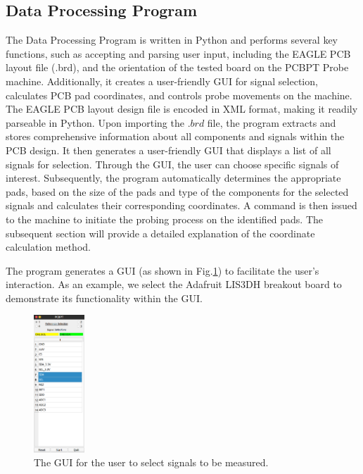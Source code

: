\documentclass[sigconf]{acmart}
\begin{document}
\subsection{Data Processing Program}
The Data Processing Program is written in Python and performs several key functions, such as accepting and parsing user input, including the EAGLE PCB layout file (.brd), and the orientation of the tested board on the PCBPT Probe machine. Additionally, it creates a user-friendly GUI for signal selection, calculates PCB pad coordinates, and controls probe movements on the machine.
The EAGLE PCB layout design file is encoded in XML format, making it readily parseable in Python. Upon importing the $.brd$ file, the program extracts and stores comprehensive information about all components and signals within the PCB design. It then generates a user-friendly GUI that displays a list of all signals for selection. Through the GUI, the user can choose specific signals of interest. Subsequently, the program automatically determines the appropriate pads, based on the size of the pads and type of the components for the selected signals and calculates their corresponding coordinates. A command is then issued to the machine to initiate the probing process on the identified pads. The subsequent section will provide a detailed explanation of the coordinate calculation method.

The program generates a GUI (as shown in Fig.\ref{GUI}) to facilitate the user's interaction. As an example, we select the Adafruit LIS3DH breakout board \cite{Adafruit_LIS3DH} to demonstrate its functionality within the GUI.

\begin{figure}[h]
  \centering
  \includegraphics[width=0.17\textwidth]{gui.png}
  \caption{The GUI for the user to select signals to be measured.}
  \label{GUI}
\end{figure}
\end{document}

